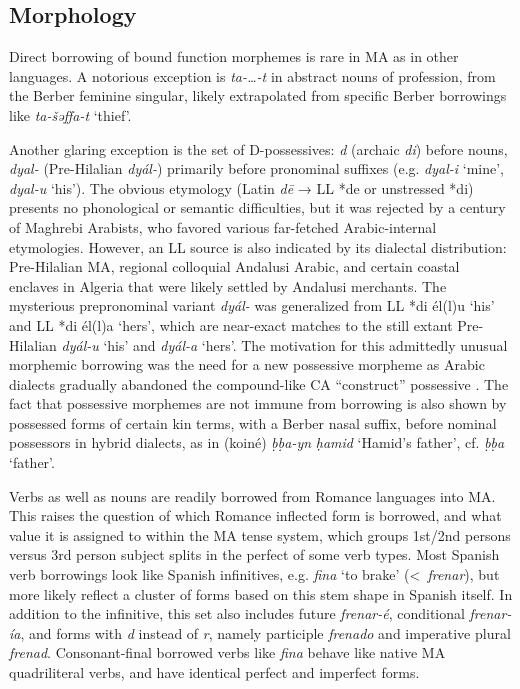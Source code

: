 \documentclass[output=paper]{langsci/langscibook}
\begin{document}
\subsection{Morphology} \label{morphol}

Direct borrowing of bound function morphemes is rare in MA as in other languages. A notorious exception is \textit{ta-…-t} in abstract nouns of profession, from the Berber feminine singular, likely extrapolated from specific Berber borrowings like \textit{ta-šəffa{\R}-t} ‘thief’. 

Another glaring exception is the set of D-possessives: \textit{d} (archaic \textit{di}) before nouns, \textit{dyal-} (Pre-Hilalian \textit{dyál-}) primarily before pronominal suffixes (e.g. \textit{dyal-i} ‘mine’, \textit{dyal-u} ‘his’). The obvious etymology (Latin \textit{dē} → LL *de or unstressed *di) presents no phonological or semantic difficulties, but it was rejected by a century of Maghrebi Arabists, who favored various far-fetched Arabic-internal etymologies. However, an LL source is also indicated by its dialectal distribution: Pre-Hilalian MA, regional colloquial Andalusi Arabic, and certain coastal enclaves in Algeria that were likely settled by Andalusi merchants. The mysterious prepronominal variant \textit{dyál-} was generalized from LL *di él(l)u ‘his’ and LL *di él(l)a ‘hers’, which are near-exact matches to the still extant Pre-Hilalian \textit{dyál-u} ‘his’ and \textit{dyál-a} ‘hers’. The motivation for this admittedly unusual morphemic borrowing was the need for a new possessive morpheme as Arabic dialects gradually abandoned the compound-like CA “construct” possessive \citep{Heath2015}. The fact that possessive morphemes are not immune from borrowing is also shown by possessed forms of certain kin terms, with a Berber nasal suffix, before nominal possessors in hybrid dialects, as in (koiné) \textit{ḅḅa-yn} \textit{ḥamid} ‘Hamid’s father’, cf. \textit{ḅḅa} ‘father’. 

Verbs as well as nouns are readily borrowed from Romance languages into MA. This raises the question of which Romance inflected form is borrowed, and what value it is assigned to within the MA tense system, which groups 1st/2nd persons versus 3rd person subject splits in the perfect of some verb types. Most Spanish verb borrowings look like Spanish infinitives, e.g. \textit{f{\R}ina{\R}} ‘to brake’ (<~\textit{frenar}), but more likely reflect a cluster of forms based on this stem shape in Spanish itself. In addition to the infinitive, this set also includes future \textit{frenar-é}, conditional \textit{frenar-ía}, and forms with \textit{d} instead of \textit{r}, namely participle \textit{frenado} and imperative plural \textit{frenad}. Consonant-final borrowed verbs like \textit{f{\R}ina{\R}} behave like native MA quadriliteral verbs, and have identical perfect and imperfect forms. 
\end{document}

